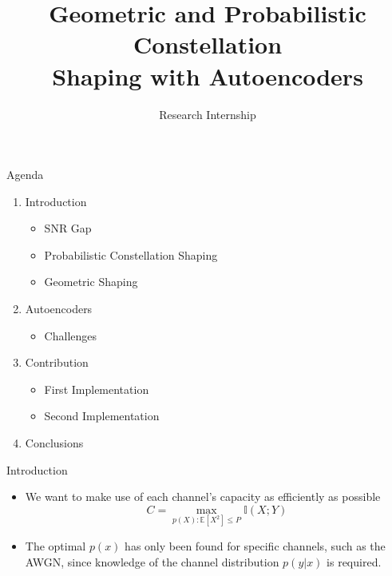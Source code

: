 \documentclass[english,aspectratio=1610,9pt,helvet,nicetitles]{ICEbeamerTUMCD}
\title{Geometric and Probabilistic Constellation\\ \vspace{0.5cm} Shaping with Autoencoders}
\subtitle{Research Internship} %
\author{\PersonVorname{} \PersonNachname{}}
\institute[]{Technical University of Munich \\ Institute for Communications Engineering}
\begin{document}
\setlength{\baselineskip}{\PraesentationAbstandAbsatz}
\setlength{\parskip}{\baselineskip}
\PraesentationMasterStandard

\PraesentationTitelseite %

\begin{frame}{Agenda}
  \begin{enumerate}
  \item Introduction
  	\begin{itemize}
  	\item SNR Gap
  	\item Probabilistic Constellation Shaping
  	\item Geometric Shaping
  	\end{itemize}
  \item Autoencoders
	\begin{itemize}
	\item Challenges
  	\end{itemize}
  \item Contribution
  \begin{itemize}
  	\item First Implementation
  	\item Second Implementation
  \end{itemize}
  \item Conclusions
  \end{enumerate}
\end{frame}


\begin{frame}{Introduction}
  \begin{itemize}
  \item We want to make use of each channel's capacity as efficiently as possible
  $$ C = \max_{p(X): \mathbb{E}[X^2] \leq P} \mathbb{I}(X;Y)$$
  \item The optimal $p(x)$ has only been found for specific channels, such as the AWGN, since knowledge of the channel distribution $p(y|x)$ is required.
  \end{itemize}
  \begin{minipage}{0.5\linewidth}
    
  \end{minipage}%
  \begin{minipage}{0.5\linewidth}
    
  \end{minipage}
\end{frame}
\end{document}
